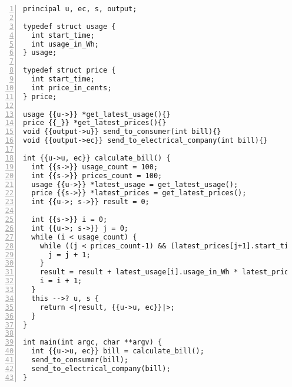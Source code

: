 \begin{lstlisting}[float, style=dlmc, numbers=left, caption={Labelled smart meter bill calculation example}, label=example:code:calculate_bill-explicit]
principal u, ec, s, output;

typedef struct usage {
  int start_time;
  int usage_in_Wh;
} usage;

typedef struct price {
  int start_time;
  int price_in_cents;
} price;

usage {{u->}} *get_latest_usage(){}
price {{_}} *get_latest_prices(){}
void {{output->u}} send_to_consumer(int bill){}
void {{output->ec}} send_to_electrical_company(int bill){}

int {{u->u, ec}} calculate_bill() {
  int {{s->}} usage_count = 100;
  int {{s->}} prices_count = 100;
  usage {{u->}} *latest_usage = get_latest_usage();
  price {{s->}} *latest_prices = get_latest_prices();
  int {{u->; s->}} result = 0;

  int {{s->}} i = 0;
  int {{u->; s->}} j = 0;
  while (i < usage_count) {
    while ((j < prices_count-1) && (latest_prices[j+1].start_time <= latest_usage[i].start_time)) {
      j = j + 1;
    }
    result = result + latest_usage[i].usage_in_Wh * latest_prices[j].price_in_cents;
    i = i + 1;
  }
  this -->? u, s {
    return <|result, {{u->u, ec}}|>;
  }
}

int main(int argc, char **argv) {
  int {{u->u, ec}} bill = calculate_bill();
  send_to_consumer(bill);
  send_to_electrical_company(bill);
}
\end{lstlisting}
